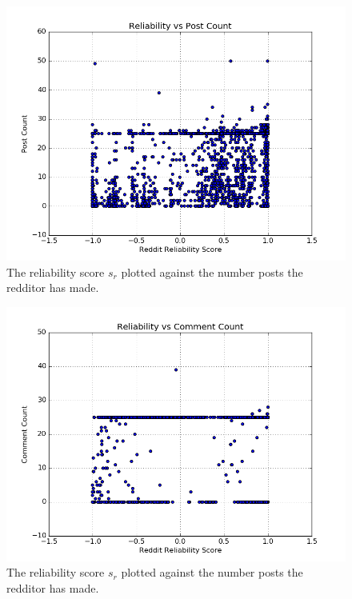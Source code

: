 \begin{figure}[tb]
    \centering
    \includegraphics[width=\linewidth]{figures/reliability_post_count.png}
    \caption{The reliability score $s_r$ plotted against the number posts the redditor has made.}
    \label{fig:reliability_post_count}
\end{figure}

\begin{figure}[tb]
    \centering
    \includegraphics[width=\linewidth]{figures/reliability_comment_count.png}
    \caption{The reliability score $s_r$ plotted against the number posts the redditor has made.}
    \label{fig:reliability_comment_count}
\end{figure}

